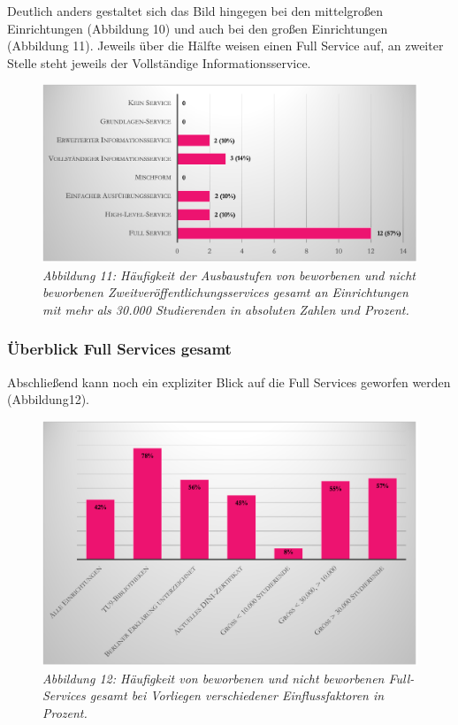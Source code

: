\documentclass[a4paper,
fontsize=11pt,
oneside,
numbers=noperiodatend,
parskip=half-,
bibliography=totoc,
final
]{scrartcl}
\begin{document}
Deutlich anders gestaltet sich das Bild hingegen bei den mittelgroßen
Einrichtungen (Abbildung 10) und auch bei den großen Einrichtungen
(Abbildung 11). Jeweils über die Hälfte weisen einen Full Service auf,
an zweiter Stelle steht jeweils der Vollständige Informationsservice.

\begin{figure}[h!]
\centering
\includegraphics[width=.9\textwidth]{img/abb11.png}
\caption{\textit{Abbildung 11: Häufigkeit der Ausbaustufen von beworbenen und
nicht beworbenen Zweitveröffentlichungsservices gesamt an Einrichtungen
mit mehr als 30.000 Studierenden in absoluten Zahlen und Prozent.}}
\end{figure}

\hypertarget{uxfcberblick-full-services-gesamt}{%
\subsubsection{Überblick Full Services
gesamt}\label{uxfcberblick-full-services-gesamt}}

Abschließend kann noch ein expliziter Blick auf die Full Services
geworfen werden (Abbildung12).

\begin{figure}[h!]
\centering
\includegraphics[width=.9\textwidth]{img/abb12.png}
\caption{\textit{Abbildung 12: Häufigkeit von beworbenen und nicht beworbenen
Full-Services gesamt bei Vorliegen verschiedener Einflussfaktoren in
Prozent.}}
\end{figure}
\end{document}
